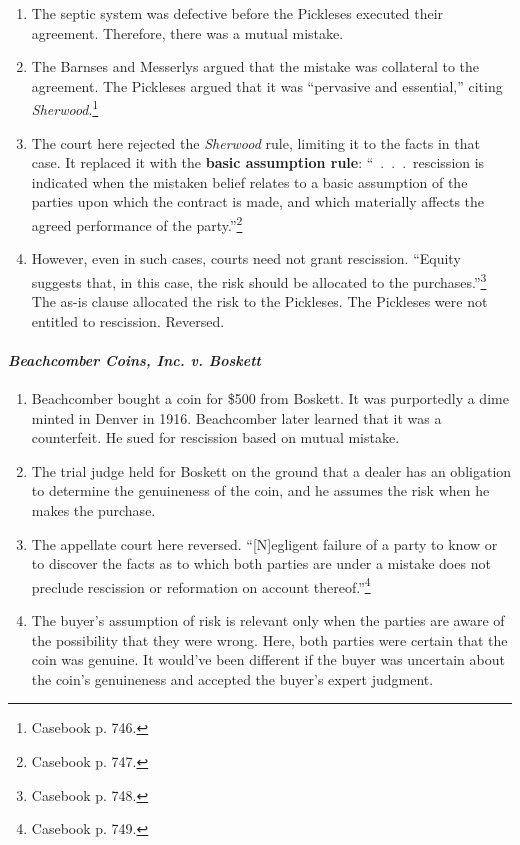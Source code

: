 \begin{enumerate}
    time the contract is executed.''\footnote{Casebook p. 745.}
    \item The septic system was defective before the Pickleses executed their 
    agreement. Therefore, there was a mutual mistake.
    \item The Barnses and Messerlys argued that the mistake was collateral to 
    the agreement. The Pickleses argued that it was ``pervasive and 
    essential,'' citing \emph{Sherwood}.\footnote{Casebook p. 746.}
    \item The court here rejected the \emph{Sherwood} rule, limiting it to the 
    facts in that case. It replaced it with the \textbf{basic assumption 
    rule}: ``~.~.~.~rescission is indicated when the mistaken belief relates 
    to a basic assumption of the parties upon which the contract is made, and 
    which materially affects the agreed performance of the 
    party.''\footnote{Casebook p. 747.}
    \item However, even in such cases, courts need not grant rescission.  
    ``Equity suggests that, in this case, the risk should be allocated to the 
    purchases.''\footnote{Casebook p. 748.} The as-is clause allocated the 
    risk to the Pickleses. The Pickleses were not entitled to rescission.  
    Reversed.
\end{enumerate}

\paragraph{\emph{Beachcomber Coins, Inc. v. Boskett}}

\begin{enumerate}
    \item Beachcomber bought a coin for \$500 from Boskett. It was purportedly 
    a dime minted in Denver in 1916. Beachcomber later learned that it was a 
    counterfeit. He sued for rescission based on mutual mistake.
    \item The trial judge held for Boskett on the ground that a dealer has an 
    obligation to determine the genuineness of the coin, and he assumes the 
    risk when he makes the purchase.
    \item The appellate court here reversed. ``[N]egligent failure of a party 
    to know or to discover the facts as to which both parties are under a 
    mistake does not preclude rescission or reformation on account 
    thereof.''\footnote{Casebook p. 749.}
    \item The buyer's assumption of risk is relevant only when the parties are 
    aware of the possibility that they were wrong. Here, both parties were 
    certain that the coin was genuine. It would've been different if the buyer 
    was uncertain about the coin's genuineness and accepted the buyer's expert 
    judgment.
\end{enumerate}

